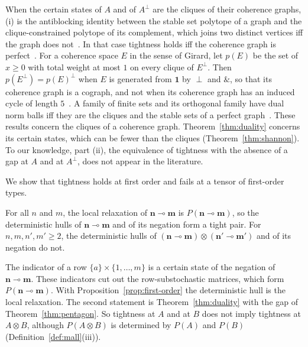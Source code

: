 When the certain states of $A$ and of $A^{\perp}$ are the cliques of their
coherence graphs, (i) is the antiblocking identity between the stable set
polytope of a graph and the clique-constrained polytope of its
complement, which joins two distinct vertices iff the graph does
not~\cite{fulkerson1971,knuth1994}. In that case tightness holds iff the
coherence graph is perfect~\cite{lovasz1972,chvatal1975}. For a coherence space $E$ in the sense of Girard, let $p(E)$ be the set of $x \ge 0$ with total
weight at most $1$ on every clique of $E^{\perp}$. Then
$p(E^{\perp}) = p(E)^{\perp}$ when $E$ is generated from $\mathbf{1}$ by
$\perp$ and $\mathbin{\&}$, so that its coherence graph is a cograph, and
not when its coherence graph has an induced cycle of length
$5$~\cite{ehrhard-td2}. A family of finite sets and its orthogonal family
have dual norm balls iff they are the cliques and the stable sets of a
perfect graph~\cite{bfp2026}. These results concern the cliques of a coherence graph.
Theorem~\ref{thm:duality} concerns its certain states, which can be fewer
than the cliques (Theorem~\ref{thm:shannon}). To our knowledge, part (ii), the equivalence of tightness with the
absence of a gap at $A$ and at $A^{\perp}$, does not appear in the
literature.

We show that tightness holds at first order and fails at a tensor of
first-order types.

\begin{corollary}
\label{cor:tensor}
For all $n$ and $m$, the local relaxation of $\mathbf{n} \multimap
\mathbf{m}$ is $P(\mathbf{n} \multimap \mathbf{m})$, so the deterministic hulls of
$\mathbf{n} \multimap \mathbf{m}$ and of its negation form a tight pair.
For $n, m, n', m' \ge 2$, the deterministic hulls of $(\mathbf{n} \multimap
\mathbf{m}) \otimes (\mathbf{n'} \multimap \mathbf{m'})$ and of its
negation do not.
\end{corollary}

\noindent
The indicator of a row $\{a\} \times \{1, \dots, m\}$ is a certain state
of the negation of $\mathbf{n} \multimap \mathbf{m}$. These indicators cut
out the row-substochastic matrices, which form
$P(\mathbf{n} \multimap \mathbf{m})$. With
Proposition~\ref{prop:first-order} the deterministic hull is the local relaxation. The
second statement is Theorem~\ref{thm:duality} with the gap of
Theorem~\ref{thm:pentagon}. So tightness at $A$ and at $B$ does not
imply tightness at $A \otimes B$, although $P(A \otimes B)$ is determined
by $P(A)$ and $P(B)$ (Definition~\ref{def:mall}(iii)).

